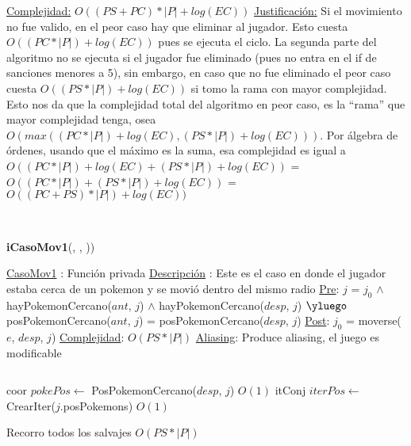\begin{Algoritmos}
\begin{algorithmic}[1]
\EndIf

\medskip
\State \underline{Complejidad:} $O((PS + PC)*|P| + log(EC))$ 
\State \underline{Justificaci\'on:} Si el movimiento no fue valido, en el peor caso hay que eliminar al jugador. Esto cuesta $O((PC *|P|) + log(EC))$ pues se ejecuta el ciclo. La segunda parte del algoritmo no se ejecuta si el jugador fue eliminado (pues no entra en el if de sanciones menores a 5), sin embargo, en caso que no fue eliminado el peor caso cuesta $O((PS *|P|) + log(EC))$ si tomo la rama con mayor complejidad. Esto nos da que la complejidad total del algoritmo en peor caso, es la ``rama'' que mayor complejidad tenga, osea $O(max((PC *|P|) + log(EC), (PS *|P|) + log(EC)))$. Por \'algebra de \'ordenes, usando que el m\'aximo es la suma, esa complejidad es igual a $O((PC *|P|) + log(EC) + (PS *|P|) + log(EC))$ = $O((PC *|P|) + (PS *|P|) + log(EC))$ = $O((PC + PS) *|P|) + log(EC))$

\end{algorithmic}



$ $\newline
$ $\newline


{\textbf{iCasoMov1}(,  , ))}
\begin{algorithmic}[1]

\Statex \underline{CasoMov1} : Funci\'on privada 
\Statex \underline{Descripci\'on} : Este es el caso en donde el jugador estaba cerca de un pokemon y se movi\'o dentro del mismo radio 
\Statex \underline{Pre}: $j$ = $j_0$ $\land$ hayPokemonCercano($ant$, $j$) $\land$ hayPokemonCercano($desp$, $j$) $\yluego$ posPokemonCercano($ant$, $j$) = posPokemonCercano($desp$, $j$) 
\Statex \underline{Post}: $j_0$ = moverse($e$, $desp$, $j$) 
\Statex \underline{Complejidad}: $O(PS *|P|)$ 
\Statex \underline{Aliasing}: Produce aliasing, el juego es modificable

$ $\newline

\State coor $pokePos \gets$ PosPokemonCercano($desp$, $j$) \Comment $O(1)$
\State itConj $iterPos \gets$ CrearIter($j$.posPokemons) \Comment $O(1)$ 

 Recorro todos los salvajes \Comment $O(PS * |P|)$


\end{algorithmic}
\end{Algoritmos}
